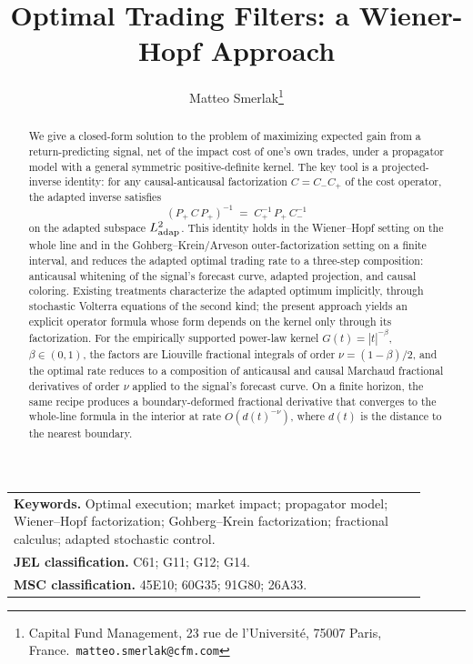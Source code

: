 \documentclass[11pt]{article}
\title{Optimal Trading Filters: a Wiener-Hopf Approach}
\author{Matteo Smerlak\thanks{Capital Fund Management, 23 rue de l'Universit\'e, 75007 Paris, France.\ \texttt{matteo.smerlak@cfm.com}}}
\date{}
\theoremstyle{plain}
\begin{document}
\maketitle

\begin{center}
\begin{tabular}{p{0.9\linewidth}}
\textbf{Keywords.} Optimal execution; market impact; propagator model; Wiener--Hopf factorization; Gohberg--Krein factorization; fractional calculus; adapted stochastic control.\\[2pt]
\textbf{JEL classification.} C61; G11; G12; G14.\\[2pt]
\textbf{MSC classification.} 45E10; 60G35; 91G80; 26A33.
\end{tabular}
\end{center}

\begin{abstract}
We give a closed-form solution to the problem of maximizing expected gain from a return-predicting signal, net of the impact cost of one's own trades, under a propagator model with a general symmetric positive-definite kernel. The key tool is a projected-inverse identity: for any causal-anticausal factorization $C = C_-C_+$ of the cost operator, the adapted inverse satisfies
\[
(P_+\,C\,P_+)^{-1} \;=\; C_+^{-1}\,P_+\,C_-^{-1}
\]
on the adapted subspace $L^2_{\rm adap}$. This identity holds in the Wiener--Hopf setting on the whole line and in the Gohberg--Krein/Arveson outer-factorization setting on a finite interval, and reduces the adapted optimal trading rate to a three-step composition: anticausal whitening of the signal's forecast curve, adapted projection, and causal coloring. Existing treatments characterize the adapted optimum implicitly, through stochastic Volterra equations of the second kind; the present approach yields an explicit operator formula whose form depends on the kernel only through its factorization. For the empirically supported power-law kernel $G(t) = |t|^{-\beta}$, $\beta\in(0,1)$, the factors are Liouville fractional integrals of order $\nu = (1-\beta)/2$, and the optimal rate reduces to a composition of anticausal and causal Marchaud fractional derivatives of order $\nu$ applied to the signal's forecast curve. On a finite horizon, the same recipe produces a boundary-deformed fractional derivative that converges to the whole-line formula in the interior at rate $O(d(t)^{-\nu})$, where $d(t)$ is the distance to the nearest boundary.
\end{abstract}
\end{document}
